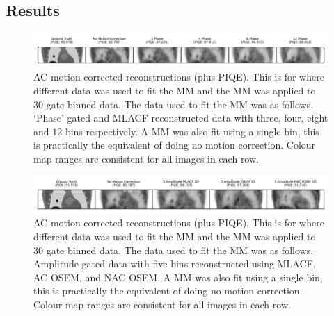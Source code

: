         \subsection{Results} \label{sec:evaluation_of_pet_ct_motion_correction_incorporating_motion_models_using_mlacf_and_complex_gating_schemes_results}
            \begin{figure}
                \centering
                
                \includegraphics[width=1.0\linewidth]{figures/motion_correction_2_results_2_phase_visual_analysis.png}
                
                \captionsetup{singlelinecheck=false}
                \caption{
                    \gls{AC} motion corrected reconstructions (plus \gls{PIQE}). This is for where different data was used to fit the \gls{MM} and the \gls{MM} was applied to $30$ gate binned data. The data used to fit the \gls{MM} was as follows. `Phase' gated and \gls{MLACF} reconstructed data with three, four, eight and $12$ bins respectively. A \gls{MM} was also fit using a single bin, this is practically the equivalent of doing no motion correction. Colour map ranges are consistent for all images in each row.
                }
                
                \label{fig:evaluation_of_pet_ct_motion_correction_incorporating_motion_models_using_mlacf_and_complex_gating_schemes_results_phase_visual_analysis}
            \end{figure}

            \begin{figure}
                \centering
                
                \includegraphics[width=1.0\linewidth]{figures/motion_correction_2_results_2_5_amplitude_visual_analysis.png}
                
                \captionsetup{singlelinecheck=false}
                \caption{
                    \gls{AC} motion corrected reconstructions (plus \gls{PIQE}). This is for where different data was used to fit the \gls{MM} and the \gls{MM} was applied to $30$ gate binned data. The data used to fit the \gls{MM} was as follows. Amplitude gated data with five bins reconstructed using \gls{MLACF}, \gls{AC} \gls{OSEM}, and \gls{NAC} \gls{OSEM}. A \gls{MM} was also fit using a single bin, this is practically the equivalent of doing no motion correction. Colour map ranges are consistent for all images in each row.
                }
                
                \label{fig:evaluation_of_pet_ct_motion_correction_incorporating_motion_models_using_mlacf_and_complex_gating_schemes_results_5_amplitude_visual_analysis}
            \end{figure}

